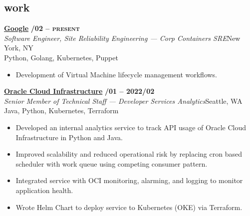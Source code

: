 \documentclass[margin,10pt]{res}
\begin{document}
\begin{resume}
\section{\sc \lsstyle work}
    \href{https://www.google.com/}{\textbf{Google}} \hfill \textsc{\bfseries{}/02 -- present}\\
    \textit{Software Engineer, Site Reliability Engineering --- Corp Containers SRE}\hfill New York, NY\\
    Python, Golang, Kubernetes, Puppet
    \begin{itemize}
        \item Development of Virtual Machine lifecycle management workflows.
    \end{itemize}

    \href{https://www.oracle.com/cloud/}{\textbf{Oracle Cloud Infrastructure}} \hfill \textsc{\bfseries{}/01 -- 2022/02}\\
    \textit{Senior Member of Technical Staff --- Developer Services Analytics}\hfill Seattle, WA\\
    Java, Python, Kubernetes, Terraform
    \begin{itemize}
        \item Developed an internal analytics service to track API usage of Oracle Cloud Infrastructure in Python and Java.
        \item Improved scalability and reduced operational risk by replacing cron based scheduler with work queue using competing
        consumer pattern.
        \item Integrated service with OCI monitoring, alarming, and logging to monitor application health.
        \item Wrote Helm Chart to deploy service to Kubernetes (OKE) via Terraform.
    \end{itemize}


\end{resume}
\end{document}
